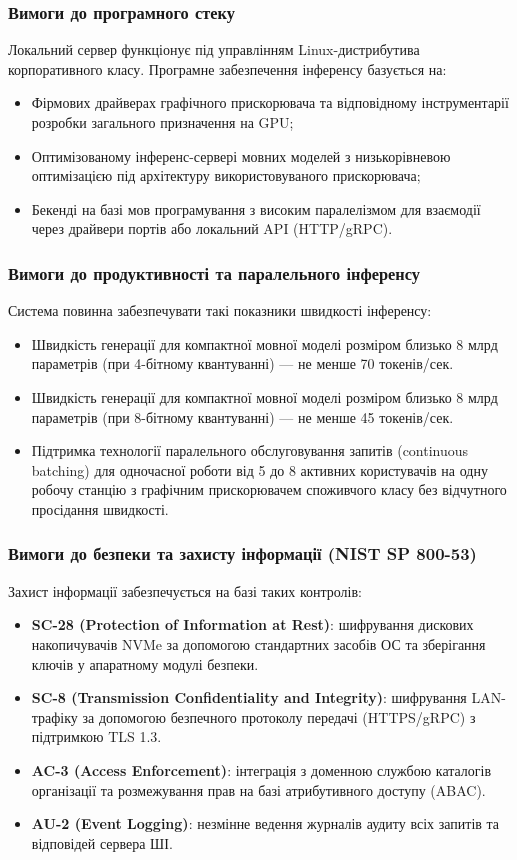 \documentclass{article}
\begin{document}
\subsubsection{Вимоги до програмного стеку}
Локальний сервер функціонує під управлінням Linux-дистрибутива корпоративного класу.
Програмне забезпечення інференсу базується на:
\begin{itemize}
    \item Фірмових драйверах графічного прискорювача та відповідному інструментарії розробки загального призначення на GPU;
    \item Оптимізованому інференс-сервері мовних моделей з низькорівневою оптимізацією під архітектуру використовуваного прискорювача;
    \item Бекенді на базі мов програмування з високим паралелізмом для взаємодії через драйвери портів або локальний API (HTTP/gRPC).
\end{itemize}

\subsubsection{Вимоги до продуктивності та паралельного інференсу}
Система повинна забезпечувати такі показники швидкості інференсу:
\begin{itemize}
    \item Швидкість генерації для компактної мовної моделі розміром близько 8 млрд параметрів (при 4-бітному квантуванні) --- не менше 70 токенів/сек.
    \item Швидкість генерації для компактної мовної моделі розміром близько 8 млрд параметрів (при 8-бітному квантуванні) --- не менше 45 токенів/сек.
    \item Підтримка технології паралельного обслуговування запитів (continuous batching) для одночасної роботи від 5 до 8 активних користувачів на одну робочу станцію з графічним прискорювачем споживчого класу без відчутного просідання швидкості.
\end{itemize}

\subsubsection{Вимоги до безпеки та захисту інформації (NIST SP 800-53)}
Захист інформації забезпечується на базі таких контролів:
\begin{itemize}
    \item \textbf{SC-28 (Protection of Information at Rest)}: шифрування дискових накопичувачів NVMe за допомогою стандартних засобів ОС та зберігання ключів у апаратному модулі безпеки.
    \item \textbf{SC-8 (Transmission Confidentiality and Integrity)}: шифрування LAN-трафіку за допомогою безпечного протоколу передачі (HTTPS/gRPC) з підтримкою TLS 1.3.
    \item \textbf{AC-3 (Access Enforcement)}: інтеграція з доменною службою каталогів організації та розмежування прав на базі атрибутивного доступу (ABAC).
    \item \textbf{AU-2 (Event Logging)}: незмінне ведення журналів аудиту всіх запитів та відповідей сервера ШІ.
\end{itemize}
\end{document}
